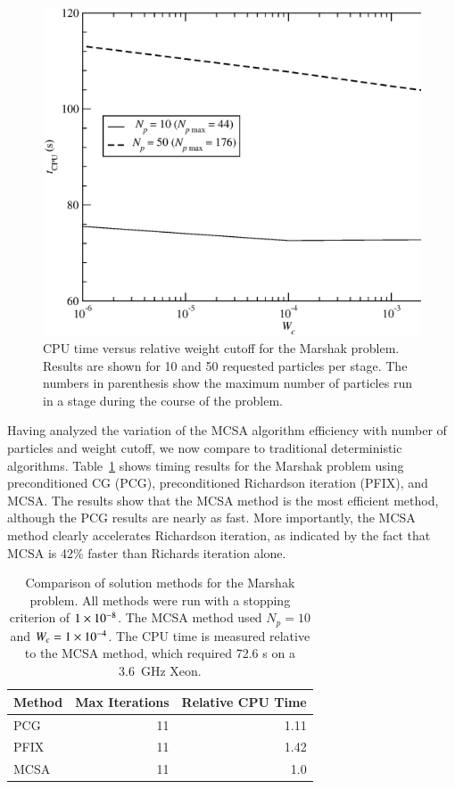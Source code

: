 \documentclass[preprint,12pt]{elsarticle}
\begin{document}
\begin{figure}[htpb!]
  \centerline{
    \includegraphics[width=5in,clip]{mrshk_wc_CPU.eps}}
  \caption{
    CPU time versus relative weight cutoff for the Marshak problem.
    Results are shown for 10 and 50 requested particles per stage.
    The numbers in parenthesis show the maximum number of particles
    run in a stage during the course of the problem.}
  \label{fig:CPU_wc}
\end{figure}

Having analyzed the variation of the MCSA algorithm efficiency with
number of particles and weight cutoff, we now compare to traditional
deterministic algorithms.  Table~\ref{tab:marshak_comparison} shows
timing results for the Marshak problem using preconditioned CG (PCG),
preconditioned Richardson iteration (PFIX), and MCSA. The results show
that the MCSA method is the most efficient method, although the PCG
results are nearly as fast.  More importantly, the MCSA method clearly
accelerates Richardson iteration, as indicated by the fact that MCSA
is 42\% faster than Richards iteration alone.

\begin{table}[htpb!]
  \begin{center}
    \begin{tabular}{lrr}\hline\hline
      \multicolumn{1}{c}{Method} & 
      \multicolumn{1}{c}{Max Iterations} & 
      \multicolumn{1}{c}{Relative CPU Time}\\\hline\hline
      PCG & 11 & 1.11 \\
      PFIX & 11 & 1.42 \\
      MCSA & 11 & 1.0 \\
      \hline\hline
    \end{tabular}
  \end{center}
  \caption{Comparison of solution methods for the Marshak problem. All
    methods were run with a stopping criterion of $1\times 10^{-8}$.  The
    MCSA method used $N_p=10$ and $W_c = 1\times 10^{-4}$.  The CPU time is
    measured relative to the MCSA method, which required 72.6 s on a
    3.6~GHz Xeon.}
  \label{tab:marshak_comparison}
\end{table}
\end{document}
